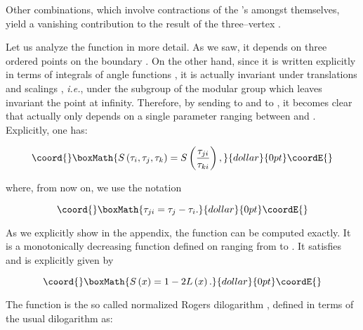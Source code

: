 \documentclass[a4paper,11pt]{article}
\providecommand{\mathbb}[1]{{\bf{#1}}}
\begin{document}
\noindent
Other combinations, which involve contractions of the \myHighlight{$\zeta$}\coordHE{}'s 
amongst themselves, yield a vanishing contribution to the result of the 
three--vertex \coordHE{}.

Let us analyze the function \coordHE{} in more detail. As we saw, it depends on
three ordered points \coordHE{} on the boundary 
\myHighlight{$\partial \Sigma $}\coordHE{}. On the other hand, since it is written explicitly in
terms of integrals of angle functions \coordHE{}, it is actually
invariant under translations \coordHE{} and scalings 
\myHighlight{$\tau \rightarrow \lambda \tau $}\coordHE{}, \textit{i.e.}, under the subgroup of the
modular group \myHighlight{$SL\left( 2,\mathbb{R}\right) $}\coordHE{} which leaves invariant the
point at infinity. Therefore, by sending \coordHE{} to \coordHE{} and \coordHE{}
to \coordHE{}, it becomes clear that \coordHE{} actually only depends on a single 
parameter ranging between \coordHE{} and \coordHE{}. Explicitly, one has:

$$\coord{}\boxMath{
S\left( \tau _{i},\tau _{j},\tau _{k}\right) =S\left( \frac{\tau _{ji}}{\tau
_{ki}}\right),
}{dollar}{0pt}\coordE{}$$

\noindent
where, from now on, we use the notation 

$$\coord{}\boxMath{
\tau _{ji}=\tau _{j}-\tau _{i}.
}{dollar}{0pt}\coordE{}$$

\noindent
As we explicitly show in the appendix, the function \coordHE{} can
be computed exactly. It is a monotonically decreasing function defined on 
\myHighlight{$\left[ 0,1\right] $}\coordHE{} ranging from \coordHE{} to \coordHE{}. It 
satisfies \coordHE{} and is explicitly 
given by

$$\coord{}\boxMath{
S\left( x\right) =1-2L\left( x\right) .
}{dollar}{0pt}\coordE{}$$

\noindent
The function \coordHE{} is the so called normalized Rogers
dilogarithm \cite{Rogers}, defined in terms of the usual dilogarithm 
\coordHE{} 
as:
\end{document}
